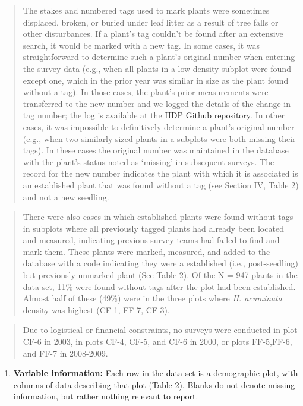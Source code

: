 \documentclass[
  12pt,
  man, donotrepeattitle,floatsintext]{apa6}
\providecommand{\tightlist}{%
  \setlength{\itemsep}{0pt}\setlength{\parskip}{0pt}}
\begin{document}
\begin{quote}
The stakes and numbered tags used to mark plants were sometimes displaced, broken, or buried under leaf litter as a result of tree falls or other disturbances. If a plant's tag couldn't be found after an extensive search, it would be marked with a new tag. In some cases, it was straightforward to determine such a plant's original number when entering the survey data (e.g., when all plants in a low-density subplot were found except one, which in the prior year was similar in size as the plant found without a tag). In those cases, the plant's prior measurements were transferred to the new number and we logged the details of the change in tag number; the log is available at the \href{https://github.com/BrunaLab/HeliconiaSurveys}{HDP Github repository}. In other cases, it was impossible to definitively determine a plant's original number (e.g., when two similarly sized plants in a subplots were both missing their tags). In these cases the original number was maintained in the database with the plant's status noted as `missing' in subsequent surveys. The record for the new number indicates the plant with which it is associated is an established plant that was found without a tag (see Section IV, Table 2) and not a new seedling.
\end{quote}

\begin{quote}
There were also cases in which established plants were found without tags in subplots where all previously tagged plants had already been located and measured, indicating previous survey teams had failed to find and mark them. These plants were marked, measured, and added to the database with a code indicating they were a established (i.e., post-seedling) but previously unmarked plant (See Table 2). Of the N = 947 plants in the data set, 11\% were found without tags after the plot had been established. Almost half of these (49\%) were in the three plots where \emph{H. acuminata} density was highest (CF-1, FF-7, CF-3).
\end{quote}

\begin{quote}
Due to logistical or financial constraints, no surveys were conducted in plot CF-6 in 2003, in plots CF-4, CF-5, and CF-6 in 2000, or plots FF-5,FF-6, and FF-7 in 2008-2009.
\end{quote}

\begin{enumerate}
\def\labelenumi{\arabic{enumi}.}
\setcounter{enumi}{7}
\tightlist
\item
  \textbf{Variable information:} Each row in the data set is a demographic plot, with columns of data describing that plot (Table 2). Blanks do not denote missing information, but rather nothing relevant to report.
\end{enumerate}
\end{document}

